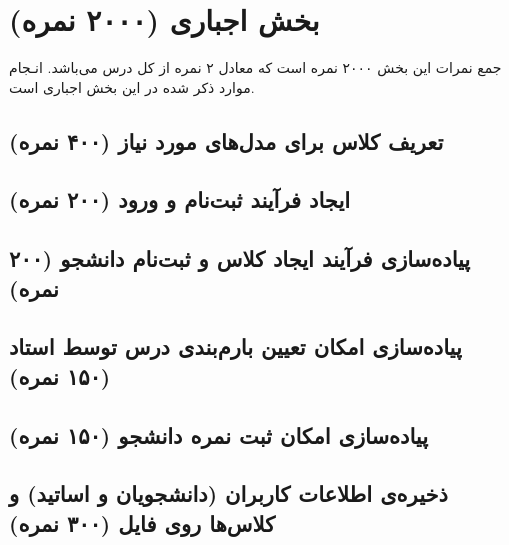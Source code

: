 \documentclass[a4paper]{report}
\begin{document}


\newpage
\tableofcontents

\newpage



\chapter{بخش اجباری (۲۰۰۰ نمره)}
\begin{center}
    \begin{warningbox}
        \Large
        جمع نمرات این بخش ۲۰۰۰ نمره است که معادل ۲ نمره از کل درس می‌باشد.
        انـجام موارد ذکر شده در این بخش اجباری است.
    \end{warningbox}
\end{center}

\section{تعریف کلاس برای مدل‌های مورد نیاز (۴۰۰ نمره)}


\section{ایجاد فرآیند ثبت‌نام و ورود (۲۰۰ نمره)}


\section{پیاده‌سازی فرآیند ایجاد کلاس و ثبت‌نام دانشجو (۲۰۰ نمره)}


\section{پیاده‌سازی امکان تعیین بارم‌بندی درس توسط استاد (۱۵۰ نمره)}


\section{پیاده‌سازی امکان ثبت نمره دانشجو (۱۵۰ نمره)}


\section{ذخیره‌ی اطلاعات کاربران (دانشجویان و اساتید) و کلاس‌ها روی فایل (۳۰۰ نمره)}

\end{document}

